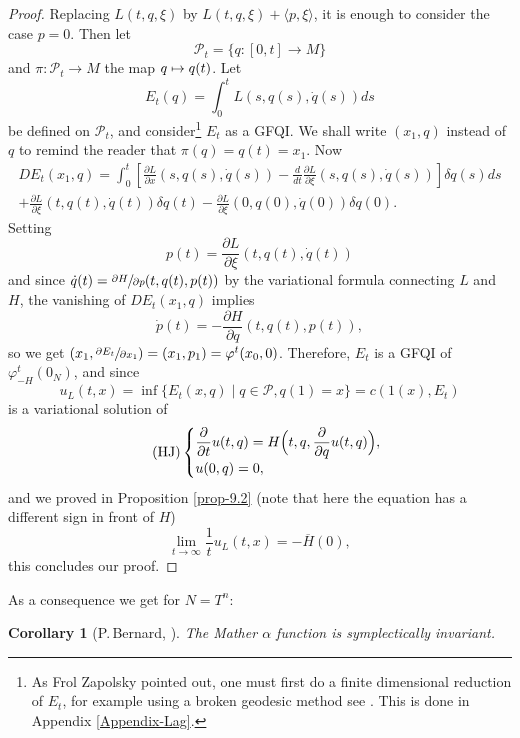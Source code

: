\documentclass[JEP,XML,SOM,NoFloatCountersInSection,Unicode,published]{cedram}
\let\ra\rightarrow
\newcommand\mto{\mathchoice{\longmapsto}{\mapsto}{\mapsto}{\mapsto}}
\newcommand{\HJ}{\mathrm{HJ}}
\numberwithin{equation}{section}
\newcommand{\GFQI}{\textup{GFQI}\xspace}
\let \phi \varphi
\theoremstyle{plain}
\newtheorem{corollary}[theorem]{Corollary}
\theoremstyle{definition}
\theoremstyle{remark}
\begin{document}
\begin{proof}
Replacing $L(t,q,\xi)$ by $L(t,q,\xi)+ \langle p, \xi \rangle$, it is enough to consider the case $p=0$.
Then let
\[
{\mathcal P}_{t}=\{q:[0,t] \ra M \}
\]
and $\pi:{\mathcal P}_{t} \to M$ the map $q \mto q(t)$. Let
\[
E_{t}(q)=\int_{0}^t L(s, q (s), \dot q (s)) ds
\]
be defined on ${\mathcal P}_{t}$, and consider\footnote{As Frol Zapolsky pointed out, one must first do a finite dimensional reduction of $E_{t}$, for example using a broken geodesic method see \cite{Chaperon2}. This is done in Appendix \ref{Appendix-Lag}.} $E_{t}$ as a \GFQI. We shall write $(x_{1},q)$ instead of $q$ to remind the reader that $\pi(q)=q(t)=x_{1}$.
Now
\begin{multline*}
DE_{t}(x_{1},q)= \int_{0}^t\left [\frac{\partial L}{\partial x}(s,q(s),\dot q (s))- \frac{d}{dt}\frac{\partial L}{\partial \xi}(s,q(s),\dot q (s))\right ] \delta q(s) ds\\
+\frac{\partial L}{\partial \xi}(t,q(t),\dot q (t)) \delta q(t)-
\frac{\partial L}{\partial \xi}(0,q(0),\dot q (0)) \delta q(0).
\end{multline*}
Setting
\[
p(t)= \frac{\partial L}{\partial \xi}(t, q(t),\dot q (t))
\]
and since $\dot q(t)=\sfrac{\partial H}{\partial p}(t, q(t), p(t))$ by the variational formula connecting $L$ and $H$, the vanishing of
$DE_{t}(x_{1},q)$ implies
\[
\dot p(t)=-\frac{\partial H}{\partial q}(t, q(t), p(t)),
\]
so we get
$(x_{1}, \sfrac{\partial E_{t}}{\partial x_{1}})= (x_{1}, p_{1}) = \phi^{t}(x_{0},0)$. Therefore, $E_{t}$ is a \GFQI of $\phi_{-H}^{t}(0_{N})$,
and since
\[
u_L(t,x)=\inf\{ E_{t}(x,q)\mid q \in {\mathcal P}, q(1)=x \}=c(1(x),E_{t})
\]
is a variational solution of
\[
\tag{$\HJ$}\begin{cases}
\dfrac{\partial}{\partial t} u (t,q) = H \Bigl(t,q,
\dfrac{\partial}{\partial q} u(t,q)\Bigr), \\ u(0,q)=0,
\end{cases}
\]
and we proved in Proposition \ref{prop-9.2} (note that here the equation has a different sign in front of $H$)
\[
\lim_{t\to \infty} \frac{1}{t}u_{L}(t,x) =- \overline H(0),
\]
this concludes our proof.
\end{proof}

As a consequence we get for $N=T^n$:

\begin{corollary}[P.\,Bernard, \cite{Bernard2}]
The Mather $\alpha$ function is symplectically invariant.
\end{corollary}
\end{document}
